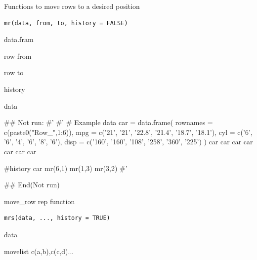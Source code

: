\documentclass[a4paper]{book}
\begin{document}
%
\begin{Description}
Functions to move rows to a desired position
\end{Description}
%
\begin{Usage}
\begin{verbatim}
mr(data, from, to, history = FALSE)
\end{verbatim}
\end{Usage}
%
\begin{Arguments}
\begin{ldescription}
\item[\code{data}] data.fram

\item[\code{from}] row from

\item[\code{to}] row to

\item[\code{history}] history
\end{ldescription}
\end{Arguments}
%
\begin{Value}
data
\end{Value}
%
\begin{Examples}
\begin{ExampleCode}

\#\# Not run: 
#'
#' # Example data
car = data.frame(
  rownames = c(paste0("Row_",1:6)),
  mpg = c('21', '21', '22.8', '21.4', '18.7', '18.1'),
  cyl = c('6', '6', '4', '6', '8', '6'),
  disp = c('160', '160', '108', '258', '360', '225')
)
car
car %
car %
car %
car %
car %
car %

#history
car %
  mr(6,1)%
  mr(1,3)%
  mr(3,2)
#'

## End(Not run)


\end{ExampleCode}
\end{Examples}
%
\begin{Description}
move\_row rep function
\end{Description}
%
\begin{Usage}
\begin{verbatim}
mrs(data, ..., history = TRUE)
\end{verbatim}
\end{Usage}
%
\begin{Arguments}
\begin{ldescription}
\item[\code{data}] data

\item[\code{...}] movelist c(a,b),c(c,d)...
\end{ldescription}
\end{Arguments}
\end{document}
